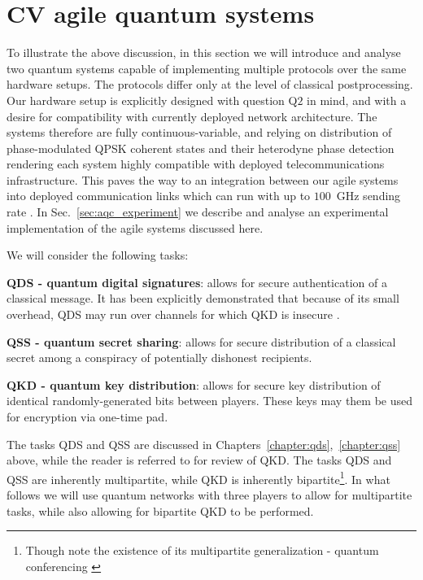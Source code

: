 \clearpage
\section{CV agile quantum systems}

To illustrate the above discussion, in this section we will introduce and analyse two quantum systems capable of implementing multiple protocols over the same hardware setups. The protocols differ only at the level of classical postprocessing. Our hardware setup is explicitly designed with question Q$2$ in mind, and with a desire for compatibility with currently deployed network architecture. The systems therefore are fully continuous-variable, and relying on distribution of phase-modulated QPSK coherent states and their heterodyne phase detection \cite{Agrawal2008} rendering each system highly compatible with deployed telecommunications infrastructure. This paves the way to an integration between our agile systems into deployed communication links which can run with up to $100$~GHz sending rate \cite{Khan2015, Khan2016}. In Sec.~\ref{sec:aqc_experiment} we describe and analyse an experimental implementation of the agile systems discussed here.

We will consider the following tasks:

\textbf{QDS - quantum digital signatures}: allows for secure authentication of a classical message. It has been explicitly demonstrated that because of its small overhead, QDS may run over channels for which QKD is insecure \cite{Amiri2016}.

\textbf{QSS - quantum secret sharing}: allows for secure distribution of a classical secret among a conspiracy of potentially dishonest recipients.

\textbf{QKD - quantum key distribution}: allows for secure key distribution of identical randomly-generated bits between players. These keys may them be used for encryption via one-time pad\cite{Schneier1996}.

The tasks QDS and QSS are discussed in Chapters~\ref{chapter:qds},~\ref{chapter:qss} above, while the reader is referred to \cite{Laudenbach2017, Scarani2009} for review of QKD. The tasks QDS and QSS are inherently multipartite, while QKD is inherently bipartite\footnote{Though note the existence of its multipartite generalization - quantum conferencing \cite{Ottaviani2017b, Ottaviani2019}}. In what follows we will use quantum networks with three players to allow for multipartite tasks, while also allowing for bipartite QKD to be performed.

